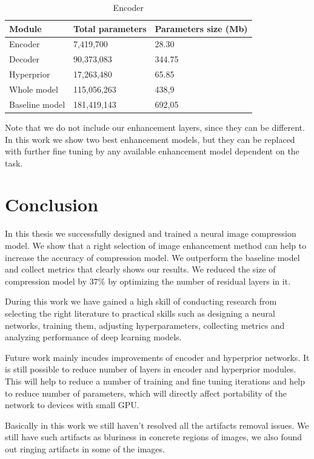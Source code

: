 \begin{table}
    \centering
    \caption{Encoder}
    \label{tab:model}
    \begin{tabular}{p{4cm}|p{4cm}|p{4cm}}
        \hline
        \textbf{Module} & \textbf{Total parameters} & \textbf{Parameters size (Mb)} \\
        \hline
        Encoder         & 7,419,700                 & 28.30                         \\
        \hline
        Decoder         & 90,373,083                & 344.75                        \\
        \hline
        Hyperprior      & 17,263,480                & 65.85                         \\
        \hline
        Whole model     & 115,056,263               & 438,9                         \\
        \hline
        Baseline model  & 181,419,143               & 692,05
    \end{tabular}
\end{table}

Note that we do not include our enhancement layers, since they can be different. In this work we show two best enhancement models, but they can be replaced with further fine tuning by any available enhancement model dependent on the task.

\chapter*{Conclusion}

In this thesis we successfully designed and trained a neural image compression model. We show that a right selection of image enhancement method can help to increase the accuracy of compression model. We outperform the baseline model and collect metrics that clearly shows our results. We reduced the size of compression model by $37\%$ by optimizing the number of residual layers in it.

During this work we have gained a high skill of conducting research from selecting the right literature to practical skills such as designing a neural networks, training them, adjusting hyperparameters, collecting metrics and analyzing performance of deep learning models.

Future work mainly incudes improvements of encoder and hyperprior networks. It is still possible to reduce number of layers in encoder and hyperprior modules. This will help to reduce a number of training and fine tuning iterations and help to reduce number of parameters, which will directly affect portability of the network to devices with small GPU.

Basically in this work we still haven't resolved all the artifacts removal issues. We still have such artifacts as bluriness in concrete regions of images, we also found out ringing artifacts in some of the images.
